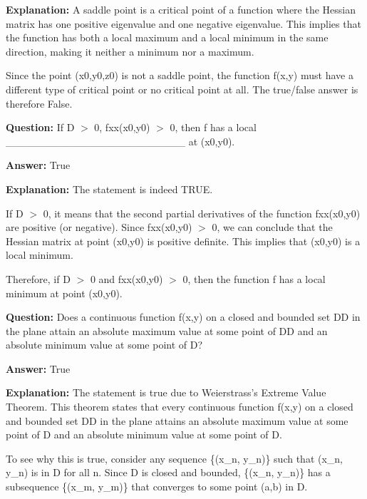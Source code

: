 \documentclass{article}
\begin{document}
                \textbf{Explanation:} A saddle point is a critical point of a function where the Hessian matrix has one positive eigenvalue and one negative eigenvalue. This implies that the function has both a local maximum and a local minimum in the same direction, making it neither a minimum nor a maximum.

Since the point (x0,y0,z0) is not a saddle point, the function f(x,y) must have a different type of critical point or no critical point at all. The true/false answer is therefore False.
                
                \vspace{0.5cm} 
        
            
                \textbf {Question:} If D \ensuremath{>} 0, fxx(x0,y0) \ensuremath{>} 0, then f has a local \_\_\_\_\_\_\_\_\_\_\_\_\_\_\_\_\_\_\_\_\_\_\_\_ at (x0,y0).
                
                \textbf{Answer:} True

                \textbf{Explanation:} The statement is indeed TRUE.

If D \ensuremath{>} 0, it means that the second partial derivatives of the function fxx(x0,y0) are positive (or negative). Since fxx(x0,y0) \ensuremath{>} 0, we can conclude that the Hessian matrix at point (x0,y0) is positive definite. This implies that (x0,y0) is a local minimum.

Therefore, if D \ensuremath{>} 0 and fxx(x0,y0) \ensuremath{>} 0, then the function f has a local minimum at point (x0,y0).
                
                \vspace{0.5cm} 
        
            
                \textbf {Question:} Does a continuous function f(x,y) on a closed and bounded set DD in the plane attain an absolute maximum value at some point of DD and an absolute minimum value at some point of D?
                
                \textbf{Answer:} True

                \textbf{Explanation:} The statement is true due to Weierstrass's Extreme Value Theorem. This theorem states that every continuous function f(x,y) on a closed and bounded set DD in the plane attains an absolute maximum value at some point of D and an absolute minimum value at some point of D.

To see why this is true, consider any sequence \{(x\_n, y\_n)\} such that (x\_n, y\_n) is in D for all n. Since D is closed and bounded, \{(x\_n, y\_n)\} has a subsequence \{(x\_m, y\_m)\} that converges to some point (a,b) in D.
\end{document}
